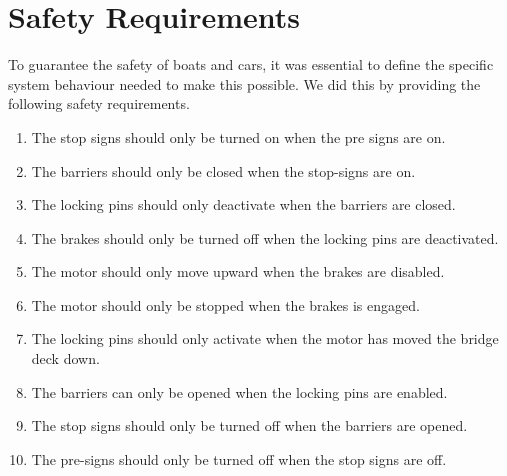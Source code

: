 	\section{Safety Requirements}
		To guarantee the safety of boats and cars, it was essential to define the specific system behaviour needed to make this possible. 
		We did this by providing the following safety requirements.
	
		\begin{enumerate}
			\item The stop signs should only be turned on when the pre signs are on.
			
			\item The barriers should only be closed when the stop-signs are on.
			
			\item The locking pins should only deactivate when the barriers are closed.
			
			\item The brakes should only be turned off when the locking pins are deactivated.
			
			\item The motor should only move upward when the brakes are disabled.
			
			\item The motor should only be stopped when the brakes is engaged.
			
				
			\item The locking pins should only activate when the motor has moved the bridge deck down.
		
			\item The barriers can only be opened when the locking pins are enabled.
			
			\item The stop signs should only be turned off when the barriers are opened.
			
			\item The pre-signs should only be turned off when the stop signs are off.
		\end{enumerate}
